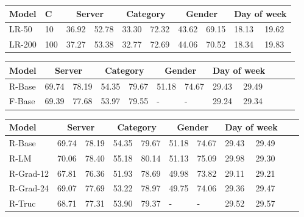 \begin{tabular}{llllllllll}
    \toprule
    \textbf{Model} & \textbf{C} & \multicolumn{2}{c}{\textbf{Server}} & \multicolumn{2}{c}{\textbf{Category}} & \multicolumn{2}{c}{\textbf{Gender}} & \multicolumn{2}{c}{\textbf{Day of week}} \\
    \midrule
    LR-50 & 10 & 36.92 & 52.78 & 33.30 & 72.32 & 43.62 & 69.15 & 18.13 & 19.62 \\
    LR-200 & 100 & 37.27 & 53.38 & 32.77 & 72.69 & 44.06 & 70.52 & 18.34 & 19.83
\end{tabular}

\begin{tabular}{llllllllllll}
    \toprule
    \textbf{Model} & \multicolumn{2}{c}{\textbf{Server}} & \multicolumn{2}{c}{\textbf{Category}} & \multicolumn{2}{c}{\textbf{Gender}} & \multicolumn{2}{c}{\textbf{Day of week}} \\
    \midrule
    R-Base & 69.74 & 78.19 & 54.35 & 79.67 & 51.18 & 74.67 & 29.43 & 29.49 \\
    F-Base & 69.39 & 77.68 & 53.97 & 79.55 & - & - & 29.24 & 29.34 \\
\end{tabular}

\begin{tabular}{l|ll|ll|ll|ll|ll}
    \toprule
    \textbf{Model} & \multicolumn{2}{c}{\textbf{Server}} & \multicolumn{2}{c}{\textbf{Category}} & \multicolumn{2}{c}{\textbf{Gender}} & \multicolumn{2}{c}{\textbf{Day of week}} \\
    \midrule
    R-Base & 69.74 & 78.19 & 54.35 & 79.67 & 51.18 & 74.67 & 29.43 & 29.49 \\
    \midrule
    R-LM & 70.06 & 78.40 & 55.18 & 80.14 & 51.13 & 75.09 & 29.98 & 29.30 \\
    R-Grad-12 & 67.81 & 76.36 & 51.93 & 78.69 & 49.98 & 73.82 & 29.11 & 29.21 \\
    R-Grad-24 & 69.07 & 77.69 & 53.22 & 78.97 & 49.75 & 74.06 & 29.36 & 29.47 \\
    R-Truc & 68.71 & 77.31 & 53.90 & 79.37 & - & - & 29.52 & 29.57 \\
\end{tabular}


